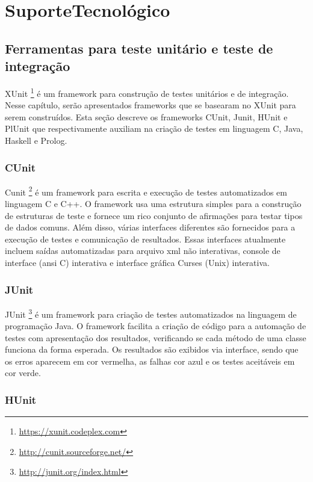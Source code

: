 \chapter{SuporteTecnológico}

\section{Ferramentas para teste unitário e teste de integração}

XUnit \footnote{\url {https://xunit.codeplex.com}} é um framework para construção de testes unitários e de integração. Nesse capítulo, serão apresentados frameworks que se basearam no XUnit para serem construídos.
Esta seção descreve os frameworks CUnit, Junit, HUnit e PlUnit que respectivamente auxiliam na criação de testes em linguagem C, Java, Haskell e Prolog.

\subsection{CUnit}

Cunit \footnote{\url {http://cunit.sourceforge.net/}} é um framework para escrita e execução de testes automatizados em linguagem C e C++. O framework  usa uma estrutura simples para a construção de estruturas de teste  e fornece um rico conjunto de afirmações para testar tipos de dados comuns. Além disso, várias interfaces diferentes são fornecidos para a execução de testes e comunicação de resultados. Essas interfaces atualmente incluem saídas automatizadas para arquivo xml não interativas, console de interface (ansi C) interativa e interface gráfica Curses (Unix) interativa.

\subsection{JUnit}

JUnit \footnote{\url {http://junit.org/index.html}} é um framework para criação de testes automatizados na linguagem de programação Java. O framework facilita a criação de código para a automação de testes com apresentação dos resultados,  verificando se cada método de uma classe funciona da forma esperada. Os resultados são exibidos via interface, sendo que os erros aparecem em cor vermelha, as falhas cor azul e os testes aceitáveis em cor verde.

\subsection{HUnit}

